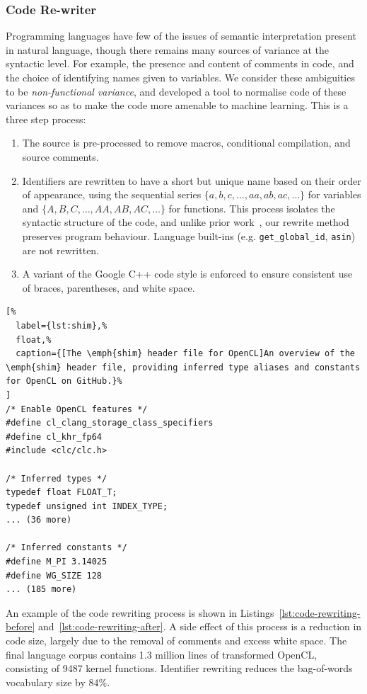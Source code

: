 \subsubsection{Code Re-writer} Programming languages have few of the issues of semantic interpretation present in natural language, though there remains many sources of variance at the syntactic level. For example, the presence and content of comments in code, and the choice of identifying names given to variables. We consider these  ambiguities to be \emph{non-functional variance}, and developed a tool to normalise code of these variances so as to make the code more amenable to machine learning. This is a three step process: %
%
\begin{enumerate}
  \item The source is pre-processed to remove macros, conditional compilation, and source comments. %
  \item Identifiers are rewritten to have a short but unique name based on their order of appearance, using the sequential series $\{a,\allowbreak b,\allowbreak c,\allowbreak \ldots,\allowbreak aa,\allowbreak ab,\allowbreak ac,\allowbreak \ldots\}$ for variables and $\{A,\allowbreak B,\allowbreak C,\allowbreak \ldots,\allowbreak AA,\allowbreak AB,\allowbreak AC,\allowbreak \ldots\}$ for functions. This process isolates the syntactic structure of the code, and unlike prior work~\cite{Allamanis2013a}, our rewrite method preserves program behaviour. Language built-ins (e.g. \texttt{get\_global\_id}, \texttt{asin}) are not rewritten.%
  \item A variant of the Google C++ code style is enforced to ensure consistent use of braces, parentheses, and white space.
\end{enumerate}


\lstset{language=C}
\begin{lstlisting}[%
  label={lst:shim},%
  float,%
  caption={[The \emph{shim} header file for OpenCL]An overview of the \emph{shim} header file, providing inferred type aliases and constants for OpenCL on GitHub.}%
]
/* Enable OpenCL features */
#define cl_clang_storage_class_specifiers
#define cl_khr_fp64
#include <clc/clc.h>

/* Inferred types */
typedef float FLOAT_T;
typedef unsigned int INDEX_TYPE;
... (36 more)

/* Inferred constants */
#define M_PI 3.14025
#define WG_SIZE 128
... (185 more)
\end{lstlisting}

\noindent %
An example of the code rewriting process is shown in Listings~\ref{lst:code-rewriting-before} and~\ref{lst:code-rewriting-after}. A side effect of this process is a reduction in code size, largely due to the removal of comments and excess white space. The final language corpus contains 1.3 million lines of transformed OpenCL, consisting of 9487 kernel functions. Identifier rewriting reduces the bag-of-words vocabulary size by 84\%.

